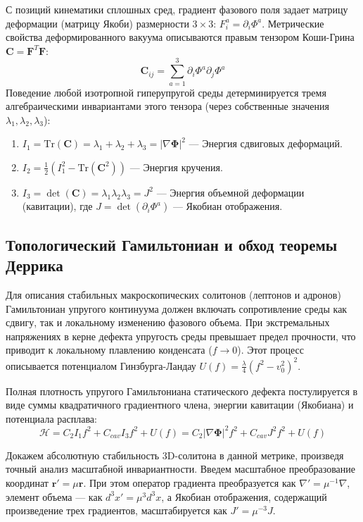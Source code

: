 \documentclass[12pt,a4paper]{article}
\begin{document}
С позиций кинематики сплошных сред, градиент фазового поля задает матрицу деформации (матрицу Якоби) размерности $3 \times 3$: $F_{i}^a = \partial_i \Phi^a$. Метрические свойства деформированного вакуума описываются правым тензором Коши-Грина $\mathbf{C} = \mathbf{F}^T \mathbf{F}$:
\begin{equation}
	\mathbf{C}_{ij} = \sum_{a=1}^3 \partial_i \Phi^a \partial_j \Phi^a
\end{equation}
Поведение любой изотропной гиперупругой среды детерминируется тремя алгебраическими инвариантами этого тензора (через собственные значения $\lambda_1, \lambda_2, \lambda_3$):
\begin{enumerate}
	\item $I_1 = \text{Tr}(\mathbf{C}) = \lambda_1 + \lambda_2 + \lambda_3 = |\nabla \boldsymbol{\Phi}|^2$ — Энергия сдвиговых деформаций.
	\item $I_2 = \frac{1}{2} (I_1^2 - \text{Tr}(\mathbf{C}^2))$ — Энергия кручения.
	\item $I_3 = \det(\mathbf{C}) = \lambda_1 \lambda_2 \lambda_3 = J^2$ — Энергия объемной деформации (кавитации), где $J = \det(\partial_i \Phi^a)$ — Якобиан отображения.
\end{enumerate}

\subsection{Топологический Гамильтониан и обход теоремы Деррика}
Для описания стабильных макроскопических солитонов (лептонов и адронов) Гамильтониан упругого континуума должен включать сопротивление среды как сдвигу, так и локальному изменению фазового объема. При экстремальных напряжениях в керне дефекта упругость среды превышает предел прочности, что приводит к локальному плавлению конденсата ($f \to 0$). Этот процесс описывается потенциалом Гинзбурга-Ландау $U(f) = \frac{\lambda}{4}(f^2 - v_0^2)^2$.

Полная плотность упругого Гамильтониана статического дефекта постулируется в виде суммы квадратичного градиентного члена, энергии кавитации (Якобиана) и потенциала расплава:
\begin{equation}
	\mathcal{H} = C_2 I_1 f^2 + C_{cav} I_3 f^2 + U(f) = C_2 |\nabla \boldsymbol{\Phi}|^2 f^2 + C_{cav} J^2 f^2 + U(f)
\end{equation}

Докажем абсолютную стабильность 3D-солитона в данной метрике, произведя точный анализ масштабной инвариантности. Введем масштабное преобразование координат $\mathbf{r}' = \mu\mathbf{r}$. 
При этом оператор градиента преобразуется как $\nabla' = \mu^{-1}\nabla$, элемент объема — как $d^3x' = \mu^3 d^3x$, а Якобиан отображения, содержащий произведение трех градиентов, масштабируется как $J' = \mu^{-3} J$. 
\end{document}
